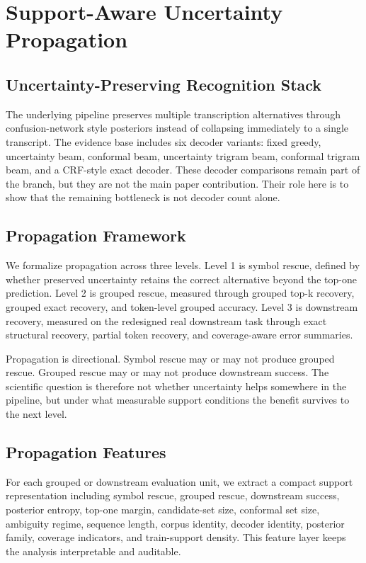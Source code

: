 \section{Support-Aware Uncertainty Propagation}

\subsection{Uncertainty-Preserving Recognition Stack}

The underlying pipeline preserves multiple transcription alternatives through confusion-network style posteriors instead of collapsing immediately to a single transcript. The evidence base includes six decoder variants: fixed greedy, uncertainty beam, conformal beam, uncertainty trigram beam, conformal trigram beam, and a CRF-style exact decoder. These decoder comparisons remain part of the branch, but they are not the main paper contribution. Their role here is to show that the remaining bottleneck is not decoder count alone.

\subsection{Propagation Framework}

We formalize propagation across three levels. Level 1 is symbol rescue, defined by whether preserved uncertainty retains the correct alternative beyond the top-one prediction. Level 2 is grouped rescue, measured through grouped top-k recovery, grouped exact recovery, and token-level grouped accuracy. Level 3 is downstream recovery, measured on the redesigned real downstream task through exact structural recovery, partial token recovery, and coverage-aware error summaries.

Propagation is directional. Symbol rescue may or may not produce grouped rescue. Grouped rescue may or may not produce downstream success. The scientific question is therefore not whether uncertainty helps somewhere in the pipeline, but under what measurable support conditions the benefit survives to the next level.

\subsection{Propagation Features}

For each grouped or downstream evaluation unit, we extract a compact support representation including symbol rescue, grouped rescue, downstream success, posterior entropy, top-one margin, candidate-set size, conformal set size, ambiguity regime, sequence length, corpus identity, decoder identity, posterior family, coverage indicators, and train-support density. This feature layer keeps the analysis interpretable and auditable.

